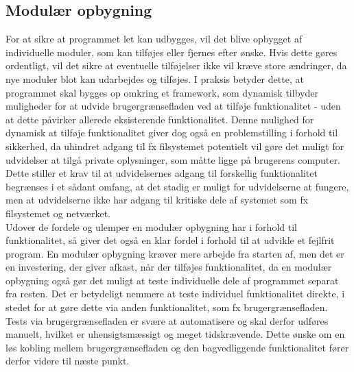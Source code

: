 \subsection{Modulær opbygning}
For at sikre at programmet let kan udbygges, vil det blive opbygget af individuelle moduler, som kan tilføjes eller fjernes efter ønske. Hvis dette gøres ordentligt, vil det sikre at eventuelle tilføjelser ikke vil kræve store ændringer, da nye moduler blot kan udarbejdes og tilføjes. I praksis betyder dette, at programmet skal bygges op omkring et framework, som dynamisk tilbyder muligheder for at udvide brugergrænsefladen ved at  tilføje funktionalitet - uden at dette påvirker allerede eksisterende funktionalitet.
Denne mulighed for dynamisk at tilføje funktionalitet giver dog også en problemstilling i forhold til sikkerhed, da uhindret adgang til fx filsystemet potentielt vil gøre det muligt for udvidelser at tilgå private oplysninger, som måtte ligge på brugerens computer. Dette stiller et krav til at udvidelsernes adgang til forskellig funktionalitet begrænses i et sådant omfang, at det stadig er muligt for udvidelserne at fungere, men at udvidelserne ikke har adgang til kritiske dele af systemet som fx filsystemet og netværket.\\

Udover de fordele og ulemper en modulær opbygning har i forhold til funktionalitet, så giver det også en klar fordel i forhold til at udvikle et fejlfrit program. En modulær opbygning kræver mere arbejde fra starten af, men det er en investering, der giver afkast, når der tilføjes funktionalitet, da en modulær opbygning også gør det muligt at teste individuelle dele af programmet separat fra resten. Det er betydeligt nemmere at teste individuel funktionalitet direkte, i stedet for at gøre dette via anden funktionalitet, som fx brugergrænsefladen. Tests via brugergrænsefladen er svære at automatisere og skal derfor udføres manuelt, hvilket er uhensigtsmæssigt og meget tidskrævende. Dette ønske om en løs kobling mellem brugergrænsefladen og den bagvedliggende funktionalitet fører derfor videre til næste punkt.
